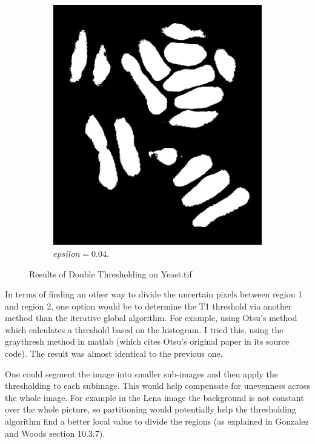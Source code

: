 \documentclass[a4paper]{article}
\begin{document}
\begin{figure}[h]
\begin{subfigure}[b]{0.25\textwidth}
        \end{subfigure}
        \begin{subfigure}[b]{0.25\textwidth}
                \centering
                \includegraphics[width=\textwidth]{q3-yeast-004.png}
                \caption{$epsilon=0.04$.}
                \label{fig:6c}
                
        \end{subfigure}
        
        
        \caption{Results of Double Thresholding on Yeast.tif}        
        \label{fig:6}
\end{figure}
In terms of finding an other way to divide the uncertain pixels between region 1 and region 2, one option would be to determine the T1 threshold via another method than the iterative global algorithm. For example, using Otsu's method which calculates a threshold based on the histogram. I tried this, using the graythresh method in matlab (which cites Otsu's original paper in its source code). The result was almost identical to the previous one.

One could segment the image into smaller sub-images and then apply the thresholding to each subimage. This would help compensate for unevenness across the whole image. For example in the Lena image the background is not constant over the whole picture, so partitioning would potentially help the thresholding algorithm find a better local value to divide the regions (as explained in Gonzalez and Woods section 10.3.7). 
\end{document}
